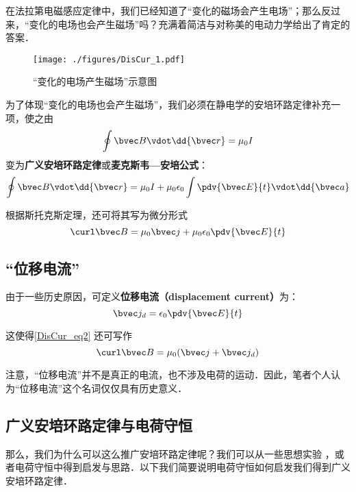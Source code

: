 
\begin{issues}
\issueDraft
\end{issues}


在法拉第电磁感应定律中，我们已经知道了“变化的磁场会产生电场”；那么反过来，“变化的电场也会产生磁场”吗？充满着简洁与对称美的电动力学给出了肯定的答案．

\begin{figure}[ht]
\centering
\texttt{[image: ./figures/DisCur\_1.pdf]}
\caption{“变化的电场产生磁场”示意图} \label{DisCur_fig1}
\end{figure}

为了体现“变化的电场也会产生磁场”，我们必须在静电学的安培环路定律补充一项，使之由
\begin{equation}
\oint \bvec B \vdot \dd{\bvec r} = \mu_0 I
\end{equation}
变为\textbf{广义安培环路定律}或\textbf{麦克斯韦—安培公式}：
\begin{equation}
\oint \bvec B \vdot \dd{\bvec r} = \mu_0 I + \mu_0 \epsilon_0 \int \pdv{\bvec E}{t} \vdot \dd{\bvec a}
\end{equation}

根据斯托克斯定理，还可将其写为微分形式
\begin{equation}\label{DisCur_eq2}
\curl \bvec B = \mu_0 \bvec j + \mu_0\epsilon_0 \pdv{\bvec E}{t}
\end{equation}

\subsection{“位移电流”}
由于一些历史原因，可定义\textbf{位移电流（displacement current）}为：
\begin{equation}
\bvec j_d = \epsilon_0 \pdv{\bvec E}{t}
\end{equation}

这使得\autoref{DisCur_eq2} 还可写作
\begin{equation}
\curl \bvec B = \mu_0 (\bvec j + \bvec j_d)
\end{equation}

注意，“位移电流”并不是真正的电流，也不涉及电荷的运动．因此，笔者个人认为“位移电流”这个名词仅仅具有历史意义．

\subsection{广义安培环路定律与电荷守恒}
那么，我们为什么可以这么推广安培环路定律呢？我们可以从一些思想实验
，或者电荷守恒中得到启发与思路．以下我们简要说明电荷守恒如何启发我们得到广义安培环路定律．


